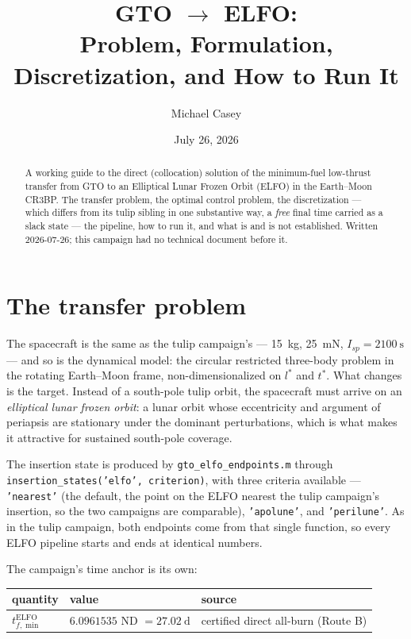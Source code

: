 \documentclass[11pt]{article}
\title{GTO $\to$ ELFO: \\
Problem, Formulation, Discretization, and How to Run It}
\author{Michael Casey}
\date{July 26, 2026}
\newcommand{\file}[1]{\texttt{#1}}
\begin{document}
\maketitle

\begin{abstract}
A working guide to the direct (collocation) solution of the minimum-fuel
low-thrust transfer from GTO to an Elliptical Lunar Frozen Orbit (ELFO) in the
Earth--Moon CR3BP. The transfer problem, the optimal control problem, the
discretization --- which differs from its tulip sibling in one substantive way,
a \emph{free} final time carried as a slack state --- the pipeline, how to run
it, and what is and is not established. Written 2026-07-26; this campaign had
no technical document before it.
\end{abstract}

\tableofcontents

\section{The transfer problem}

The spacecraft is the same as the tulip campaign's --- \SI{15}{\kilo\gram},
\SI{25}{\milli\newton}, $I_{sp}=\SI{2100}{\second}$ --- and so is the dynamical
model: the circular restricted three-body problem in the rotating Earth--Moon
frame, non-dimensionalized on $l^\ast$ and $t^\ast$. What changes is the
target. Instead of a south-pole tulip orbit, the spacecraft must arrive on an
\emph{elliptical lunar frozen orbit}: a lunar orbit whose eccentricity and
argument of periapsis are stationary under the dominant perturbations, which is
what makes it attractive for sustained south-pole coverage.

The insertion state is produced by \file{gto\_elfo\_endpoints.m} through
\file{insertion\_states('elfo', criterion)}, with three criteria available ---
\texttt{'nearest'} (the default, the point on the ELFO nearest the tulip
campaign's insertion, so the two campaigns are comparable),
\texttt{'apolune'}, and \texttt{'perilune'}. As in the tulip campaign, both
endpoints come from that single function, so every ELFO pipeline starts and
ends at identical numbers.

The campaign's time anchor is its own:
\begin{center}
\begin{tabular}{lll}
\toprule
quantity & value & source \\
\midrule
$t_{f,\min}^{\text{ELFO}}$ & $6.0961535$ ND $=\SI{27.02}{\day}$
   & certified direct all-burn (Route B) \\
\bottomrule
\end{tabular}
\end{center}
\end{document}
